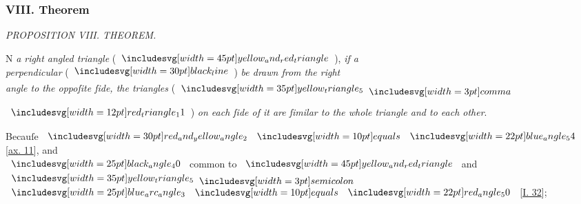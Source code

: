 \documentclass[12pt,preview]{standalone}
\begin{document}
\subsubsection{VIII. Theorem}

\begin{minipage}[t]{0.33\textwidth}
    \vspace{40pt}
    
\end{minipage}%
\hfill
\begin{minipage}[t]{0.64\textwidth}
    \vspace{0pt}

    \begin{center}
        \textit{PROPOSITION VIII. THEOREM.}\label{book6pr8} \\
    \end{center}

    \hfill

    \begin{center}
        \raggedright \lettrine[lines=4, loversize=1, nindent=0pt]{}{}N \textit{a right angled triangle} (\hspace{-1ex}$\img[0][0][45]{yellow_and_red_triangle}$\hspace{-1ex}), \textit{if a\\ perpendicular} (\hspace{-1ex}$\blackline$\hspace{-1ex}) \textit{be drawn from the right\\ angle to the oppoſite ſide, the triangles} (\hspace{-1ex}$\img[0][0][35]{yellow_triangle_5} \bcomma$
    \end{center}
    \raggedright $\img[0][0][12]{red_triangle_11}$\hspace{-1ex}) \textit{on each ſide of it are ſimilar to the whole triangle and to each other}.

    \hfill

    \hfill

    \begin{center}
        Becauſe $\img[0][0][30]{red_and_yellow_angle_2} \bequals \img[0][0][22]{blue_angle_54}$ [\hyperref[ax11]{ax. 11}], and\\
        $\img{black_angle_40}$ common to $\img[0][0][45]{yellow_and_red_triangle}$ and $\img[0][0][35]{yellow_triangle_5} \bsemicolon$\\
        $\img{blue_arc_angle_3} \bequals \img[0][0][22]{red_angle_50}$ [\hyperref[book1pr32]{\textsc{I.} 32}];
    \end{center}


\end{minipage}
\end{document}
